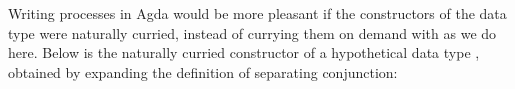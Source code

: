 \begin{remark}
    \label{rem:curry}
    Writing processes in Agda would be more pleasant if the constructors of the
    data type  were naturally curried, instead of currying
    them on demand with  as we do here.
    Below is the naturally curried constructor 
    of a hypothetical data type , obtained by expanding the
    definition of separating conjunction:
\begin{code}[hide]%
\>[0]\AgdaSpace{}%
\AgdaSpace{}%
\AgdaSymbol{:}\AgdaSpace{}%
\AgdaSpace{}%
\AgdaSpace{}%
\AgdaSpace{}%
\<%
\end{code}
\begin{code}%
\>[0][@{}l@{\AgdaIndent{1}}]%
\>[2]\AgdaSpace{}%
\AgdaSymbol{:}%
\>[341I]\AgdaSpace{}%
\AgdaSpace{}%
\AgdaSpace{}%
\AgdaSpace{}%
\AgdaSpace{}%
\AgdaSpace{}%
\AgdaSymbol{\}}\AgdaSpace{}%
\AgdaSpace{}%
\AgdaSpace{}%
\AgdaSymbol{(}\AgdaSpace{}%
\AgdaSpace{}%
\AgdaSymbol{)}\AgdaSpace{}%
\AgdaSpace{}%
\AgdaSpace{}%
\AgdaSpace{}%
\AgdaSpace{}%
\AgdaSpace{}%
\AgdaOperator{\AgdaDatatype{+}}\AgdaSpace{}%
\AgdaSpace{}%
\<%
\\
\>[.][@{}l@{}]\<[341I]%
\>[9]\AgdaSpace{}%
\AgdaSymbol{(}\AgdaSpace{}%
\AgdaSpace{}%
\AgdaSymbol{)}\AgdaSpace{}%
\AgdaSpace{}%
\AgdaSpace{}%
\AgdaSpace{}%
\AgdaSpace{}%
\AgdaOperator{\AgdaDatatype{+}}\AgdaSpace{}%
\AgdaSpace{}%
\AgdaSpace{}%
\AgdaSpace{}%
\AgdaSymbol{(}\AgdaSpace{}%
\AgdaSpace{}%
\AgdaSymbol{)}\AgdaSpace{}%
\AgdaSpace{}%
\AgdaSpace{}%
\AgdaSymbol{(}\AgdaSpace{}%
\AgdaSpace{}%
\AgdaSpace{}%
\AgdaSpace{}%
\AgdaSymbol{)}\<%
\end{code}


\end{remark}
